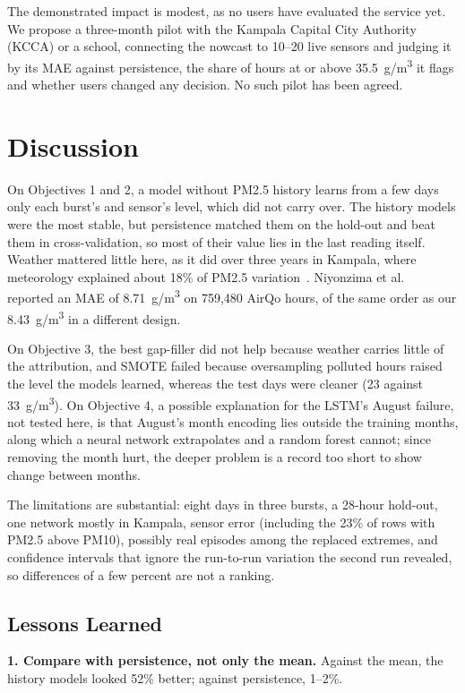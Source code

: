 \documentclass{ieeeaccess}
\newcommand{\ugm}{\textmu g/m\textsuperscript{3}}
\begin{document}
The demonstrated impact is modest, as no users have evaluated the service yet. We propose a three-month pilot with the Kampala Capital City Authority (KCCA) or a school, connecting the nowcast to 10--20 live sensors and judging it by its MAE against persistence, the share of hours at or above 35.5~\ugm{} it flags and whether users changed any decision. No such pilot has been agreed.

\section{Discussion}\label{sec:discussion}

On Objectives 1 and 2, a model without PM2.5 history learns from a few days only each burst's and sensor's level, which did not carry over. The history models were the most stable, but persistence matched them on the hold-out and beat them in cross-validation, so most of their value lies in the last reading itself. Weather mattered little here, as it did over three years in Kampala, where meteorology explained about 18\% of PM2.5 variation~\cite{ref35}. Niyonzima et al.~\cite{ref10} reported an MAE of 8.71~\ugm{} on 759,480 AirQo hours, of the same order as our 8.43~\ugm{} in a different design.

On Objective 3, the best gap-filler did not help because weather carries little of the attribution, and SMOTE failed because oversampling polluted hours raised the level the models learned, whereas the test days were cleaner (23 against 33~\ugm{}). On Objective 4, a possible explanation for the LSTM's August failure, not tested here, is that August's month encoding lies outside the training months, along which a neural network extrapolates and a random forest cannot; since removing the month hurt, the deeper problem is a record too short to show change between months. 

The limitations are substantial: eight days in three bursts, a 28-hour hold-out, one network mostly in Kampala, sensor error (including the 23\% of rows with PM2.5 above PM10), possibly real episodes among the replaced extremes, and confidence intervals that ignore the run-to-run variation the second run revealed, so differences of a few percent are not a ranking.

\subsection{Lessons Learned}\label{sec:lessons-learned}

\textbf{1. Compare with persistence, not only the mean.} Against the mean, the history models looked 52\% better; against persistence, 1--2\%.
\end{document}
